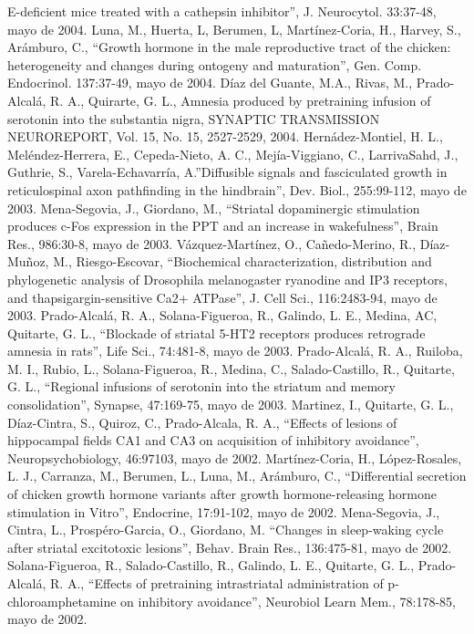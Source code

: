 E-deficient mice treated with a cathepsin inhibitor”, J. Neurocytol. 33:37-48,  mayo de 2004.
Luna, M., Huerta, L, Berumen, L, Martínez-Coria, H., Harvey, S., Arámburo, C., “Growth hormone in the male reproductive tract of the chicken: heterogeneity 
and changes during ontogeny and maturation”, Gen. Comp. Endocrinol. 137:37-49,  mayo de 2004.
Díaz del Guante, M.A., Rivas, M., Prado-Alcalá, R. A., Quirarte, G. L., Amnesia produced by pretraining infusion of serotonin into the substantia nigra, 
SYNAPTIC TRANSMISSION NEUROREPORT, Vol. 15, No. 15, 2527-2529,  2004.
Hernádez-Montiel, H. L., Meléndez-Herrera, E., Cepeda-Nieto, A. C., Mejía-Viggiano, C., LarrivaSahd, J., Guthrie, S., Varela-Echavarría, A.”Diffusible 
signals and fasciculated growth in reticulospinal axon pathfinding in the hindbrain”, Dev. Biol., 255:99-112,  mayo de 2003.
Mena-Segovia, J., Giordano, M., “Striatal dopaminergic stimulation produces c-Fos expression in the PPT and an increase in wakefulness”, Brain Res., 
986:30-8,  mayo de 2003.
Vázquez-Martínez, O., Cañedo-Merino, R., Díaz-Muñoz, M., Riesgo-Escovar, “Biochemical characterization, distribution and phylogenetic analysis of Drosophila 
melanogaster ryanodine and IP3 receptors, and thapsigargin-sensitive Ca2+ ATPase”, J. Cell Sci., 116:2483-94,  mayo de 2003.
Prado-Alcalá, R. A., Solana-Figueroa, R., Galindo, L. E., Medina, AC, Quitarte, G. L., “Blockade of striatal 5-HT2 receptors produces retrograde amnesia in 
rats”, Life Sci., 74:481-8,  mayo de 2003.
Prado-Alcalá, R. A., Ruiloba, M. I., Rubio, L., Solana-Figueroa, R., Medina, C., Salado-Castillo, R., Quitarte, G. L., “Regional infusions of serotonin into 
the striatum and memory consolidation”, Synapse, 47:169-75,  mayo de 2003.
Martinez, I., Quitarte, G. L., Díaz-Cintra, S., Quiroz, C., Prado-Alcala, R. A., “Effects of lesions of hippocampal fields CA1 and CA3 on acquisition of 
inhibitory avoidance”, Neuropsychobiology, 46:97103,  mayo de 2002.
Martínez-Coria, H., López-Rosales, L. J., Carranza, M., Berumen, L., Luna, M., Arámburo, C., “Differential secretion of chicken growth hormone variants 
after growth hormone-releasing hormone stimulation in Vitro”, Endocrine, 17:91-102,  mayo de 2002.
Mena-Segovia, J., Cintra, L., Prospéro-Garcia, O., Giordano, M. “Changes in sleep-waking cycle after striatal excitotoxic lesions”, Behav. Brain Res., 
136:475-81,  mayo de 2002.
Solana-Figueroa, R., Salado-Castillo, R., Galindo, L. E., Quitarte, G. L., Prado-Alcalá, R. A., “Effects of pretraining intrastriatal administration of 
p-chloroamphetamine on inhibitory avoidance”, Neurobiol Learn Mem., 78:178-85,  mayo de 2002.
